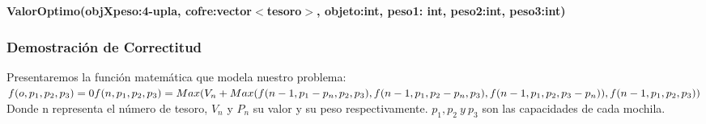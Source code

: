 \documentclass[spanish,12pt]{article}
\begin{document}
{\begin{algorithm}[H]{\textbf{ValorOptimo(objXpeso:4-upla, cofre:vector$<$tesoro$>$, objeto:int, peso1: int, peso2:int, peso3:int)}}
\begin{algorithmic}[1]
	\end{algorithmic}
\end{algorithm}

\newpage

\subsubsection{Demostración de Correctitud}
Presentaremos la función matemática que modela nuestro problema:\\ %

$f(o,p_{1},p_{2},p_{3})=0 \\
f(n,p_{1},p_{2},p_{3}) = Max(V_{n}+Max(f(n-1,p_{1}-p_{n},p_{2},p_{3}), f(n-1,p_{1},p_{2}-p_{n},p_{3}), f(n-1,p_{1},p_{2},p_{3}-p_{n})),f(n-1,p_{1},p_{2},p_{3})) $
\\
Donde n representa el número de tesoro, $V_{n}$ y $P_{n}$ su valor y su peso respectivamente. $p_{1},p_{2}\ y \ p_{3}$ son las capacidades de cada mochila.

}
\end{document}

